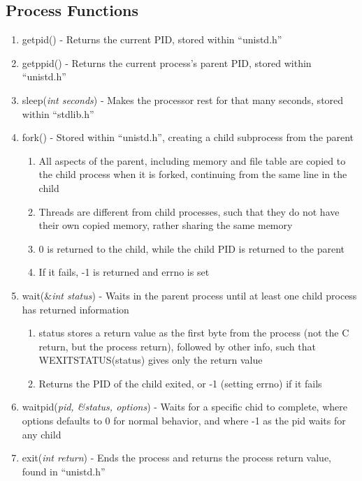 \documentclass[11 pt, twoside]{article}
\begin{document}
\subsection{Process Functions}
\begin{enumerate}
\item getpid() - Returns the current PID, stored within ``unistd.h''
\item getppid() - Returns the current process's parent PID, stored within ``unistd.h''
\item sleep(\textit{int seconds}) - Makes the processor rest for that many seconds, stored within ``stdlib.h''
\item fork() - Stored within ``unistd.h'', creating a child subprocess from the parent
\begin{enumerate}
\item All aspects of the parent, including memory and file table are copied to the child process when it is forked, continuing from the same line in the child
\item Threads are different from child processes, such that they do not have their own copied memory, rather sharing the same memory
\item 0 is returned to the child, while the child PID is returned to the parent
\item If it fails, -1 is returned and errno is set
\end{enumerate}
\item wait(\&\textit{int status}) - Waits in the parent process until at least one child process has returned information
\begin{enumerate}
\item status stores a return value as the first byte from the process (not the C return, but the process return), followed by other info, such that WEXITSTATUS(status) gives only the return value
\item Returns the PID of the child exited, or -1 (setting errno) if it fails
\end{enumerate}
\item waitpid(\textit{pid, \&status, options}) - Waits for a specific chid to complete, where options defaults to 0 for normal behavior, and where -1 as the pid waits for any child
\item exit(\textit{int return}) - Ends the process and returns the process return value, found in ``unistd.h''
\end{enumerate}
\end{document}
